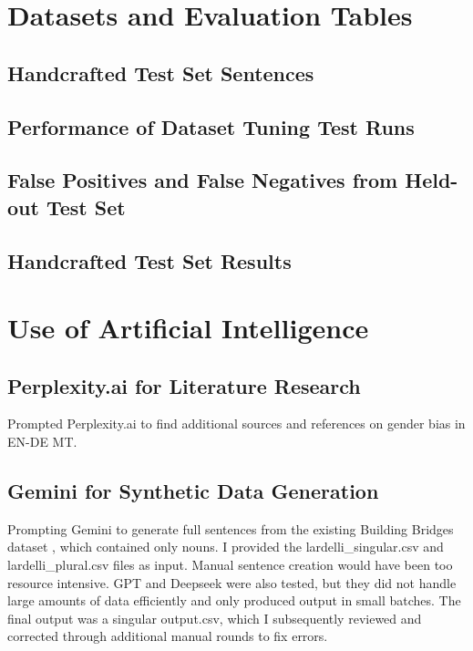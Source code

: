 \begin{appendices}

\section{Datasets and Evaluation Tables}\label{appendix:datasets}

\subsection{Handcrafted Test Set Sentences}
\label{appendix:handcrafted_testset}


\subsection{Performance of Dataset Tuning Test Runs}
\label{appendix:dataset_tuning_table}


\subsection{False Positives and False Negatives from Held-out Test Set}
\label{tab:fp_fn_table}


\subsection{Handcrafted Test Set Results}
\label{tab:handcrafted_testset_results}



\section{Use of Artificial Intelligence}\label{appendix:artificial_intelligece}

\subsection{Perplexity.ai for Literature Research}
Prompted Perplexity.ai to find additional sources and references on gender bias in EN-DE MT.



\subsection{Gemini for Synthetic Data Generation}\label{appendix:gemini_prompt}
Prompting Gemini to generate full sentences from the existing Building Bridges dataset \parencite{lardelliBuildingBridgesDataset2024}, which contained only nouns. I provided the lardelli\_singular.csv and lardelli\_plural.csv files as input. Manual sentence creation would have been too resource intensive. GPT and Deepseek were also tested, but they did not handle large amounts of data efficiently and only produced output in small batches. The final output was a singular output.csv, which I subsequently reviewed and corrected through additional manual rounds to fix errors.

\end{appendices}
